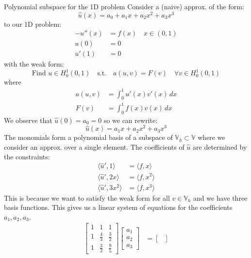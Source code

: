 \begin{example}{Polynomial subspace for the 1D problem}{}
    Consider a (naive) approx. of the form:
    \[
        \hat{u}(x) = a_0 + a_1 x + a_2 x^2 + a_3 x^3
    \]
    to our 1D problem:
    \begin{align*}
        -u''(x) & = f(x) \quad x \in (0, 1) \\
        u(0)    & = 0                       \\
        u'(1)   & = 0
    \end{align*}
    with the weak form:
    \[\text{Find } u \in H^1_0(0, 1) \quad \text{s.t.} \quad a(u, v) = F(v) \quad \forall v \in H^1_0(0, 1)\]
    where
    \begin{align*}
        a(u, v) & = \int_0^1 u'(x) v'(x) \, dx \\
        F(v)    & = \int_0^1 f(x) v(x) \, dx
    \end{align*}
    We observe that $\hat{u}(0) = a_0 = 0$ so we can rewrite:
    \[
        \hat{u}(x) = a_1 x + a_2 x^2 + a_3 x^3
    \]
    The monomials form a polynomial basis of a subspace of $\mathbb{V}_h \subset \mathbb{V}$ where we consider an approx. over a single element. The coefficients of $\hat{u}$ are determined by the constraints:
    \begin{align*}
        \langle \hat{u}', 1 \rangle    & = \langle f, x \rangle   \\
        \langle \hat{u}', 2x \rangle   & = \langle f, x^2 \rangle \\
        \langle \hat{u}', 3x^2 \rangle & = \langle f, x^3 \rangle
    \end{align*}
    This is because we want to satisfy the weak form for all $v \in \mathbb{V}_h$ and we have three basis functions.
    This gives us a linear system of equations for the coefficients $a_1, a_2, a_3$.
    \begin{align*}
        \begin{bmatrix}
            1 & 1           & 1           \\
            1 & \frac{4}{3} & \frac{3}{2} \\
            1 & \frac{3}{2} & \frac{9}{5}
        \end{bmatrix}
        \begin{bmatrix}
            a_1 \\
            a_2 \\
            a_3
        \end{bmatrix}
         & =
        \begin{bmatrix}

\end{bmatrix}
\end{align*}
\end{example}

